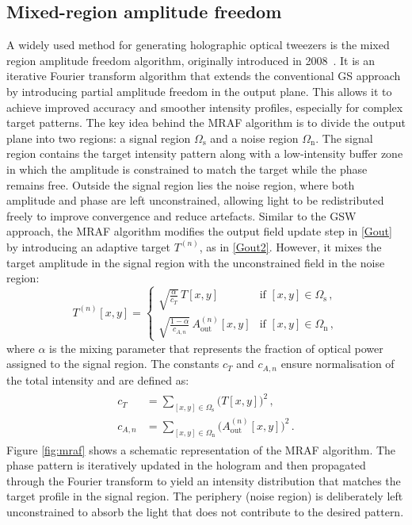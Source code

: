 \documentclass[../Thesis-IJspeert.tex]{subfiles}
\begin{document}
\subsection{Mixed-region amplitude freedom}
A widely used method for generating holographic optical tweezers is the mixed region amplitude freedom algorithm, originally introduced in 2008~\cite{Pasienski2008}. It is an iterative Fourier transform algorithm that extends the conventional GS approach by introducing partial amplitude freedom in the output plane. This allows it to achieve improved accuracy and smoother intensity profiles, especially for complex target patterns. The key idea behind the MRAF algorithm is to divide the output plane into two regions: a signal region $\Omega_\mathrm{s}$ and a noise region $\Omega_\mathrm{n}$. The signal region contains the target intensity pattern along with a low-intensity buffer zone in which the amplitude is constrained to match the target while the phase remains free. Outside the signal region lies the noise region, where both amplitude and phase are left unconstrained, allowing light to be redistributed freely to improve convergence and reduce artefacts. Similar to the GSW approach, the MRAF algorithm modifies the output field update step in \autoref{Gout} by introducing an adaptive target $T^{(n)}$, as in \autoref{Gout2}. However, it mixes the target amplitude in the signal region with the unconstrained field in the noise region:
\begin{equation}
\label{mrafmixing}
T^{(n)}[x,y] =
\begin{cases}
\sqrt{\frac{\alpha}{c_T}} \,T[x,y] & \text{if } [x,y] \in \Omega_\mathrm{s}\,, \\
\sqrt{\frac{1-\alpha}{c_{A,n}}}\,A^{(n)}_{\mathrm{out}}[x,y] & \text{if } [x,y] \in \Omega_\mathrm{n}\,,
\end{cases}
\end{equation}
where $\alpha$ is the mixing parameter that represents the fraction of optical power assigned to the signal region. The constants $c_T$ and $c_{A,n}$ ensure normalisation of the total intensity and are defined as:
\begin{align}
\begin{split}
c_T &= \sum_{[x,y]\in\Omega_\mathrm{s}} \Big(T[x,y]\Big)^{\!2}\,,\\
c_{A,n} &= \sum_{[x,y]\in\Omega_\mathrm{n}} \Big(A^{(n)}_{\mathrm{out}}[x,y]\Big)^{\!2}\,.
\end{split}
\end{align}
Figure \autoref{fig:mraf} shows a schematic representation of the MRAF algorithm. The phase pattern is iteratively updated in the hologram and then propagated through the Fourier transform to yield an intensity distribution that matches the target profile in the signal region. The periphery (noise region) is deliberately left unconstrained to absorb the light that does not contribute to the desired pattern.
\end{document}
